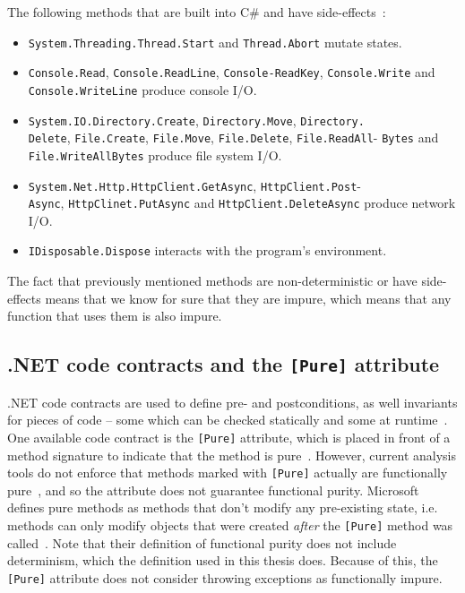 \documentclass[a4paper,12pt]{article}
\begin{document}
The following methods that are built into C\# and have side-effects~\cite{dixin2015}:

\begin{itemize}
  \item \texttt{System.Threading.Thread.Start} and \texttt{Thread.Abort} mutate states.
  \item \texttt{Console.Read}, \texttt{Console.ReadLine}, \texttt{Console-ReadKey}, \texttt{Console.\allowbreak Write} and \texttt{Console.WriteLine} produce console I/O.
  \item \texttt{System.IO.Directory.Create}, \texttt{Directory.Move}, \texttt{Directory.}\\\texttt{Delete}, \texttt{File.Create}, \texttt{File.Move}, \texttt{File.Delete}, \texttt{File.ReadAll\allowbreak }- \texttt{Bytes} and \texttt{File.WriteAllBytes} produce file system I/O.
\item \texttt{System.Net.Http.HttpClient.GetAsync}, \texttt{HttpClient.Post}- \\\texttt{Async}, \texttt{HttpClinet.PutAsync} and \texttt{HttpClient.DeleteAsync} produce network I/O.
  \item \texttt{IDisposable.Dispose} interacts with the program's environment.
\end{itemize}

The fact that previously mentioned methods are non-deterministic or have side-effects means that we know for sure that they are impure, which means that any function that uses them is also impure.

\subsection{.NET code contracts and the \texttt{[Pure]} attribute} \label{sub:code-contracts}

.NET code contracts are used to define pre- and postconditions, as well invariants for pieces of code -- some which can be checked statically and some at runtime~\cite{microsoft-code-contracts}. One available code contract is the \texttt{[Pure]} attribute, which is placed in front of a method signature to indicate that the method is pure~\cite{microsoft-code-contracts}. However, current analysis tools do not enforce that methods marked with \texttt{[Pure]} actually are functionally pure~\cite{microsoft-pure-attribute}, and so the attribute does not guarantee functional purity. Microsoft defines pure methods as methods that don't modify any pre-existing state, i.e. methods can only modify objects that were created \textit{after} the \texttt{[Pure]} method was called~\cite{microsoft-code-contracts}. Note that their definition of functional purity does not include determinism, which the definition used in this thesis does. Because of this, the \texttt{[Pure]} attribute does not consider throwing exceptions as functionally impure.
\end{document}
